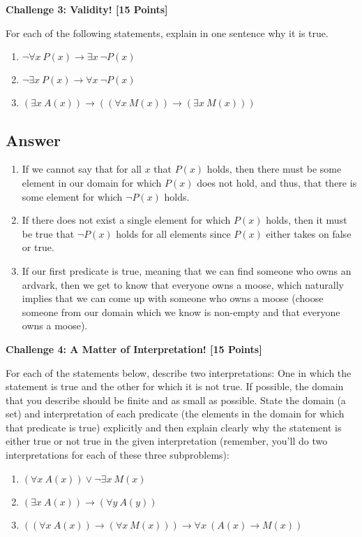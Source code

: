 \documentclass[12pt]{article}
\newcommand{\OR}{\vee}
\newcommand{\IMPLIES}{\rightarrow}
\newcommand{\Problem}[3]{\mbox{} \newline \noindent \textbf{\textbf{Challenge #1: #2 [#3 Points] \\ }}}
\begin{document}
\Problem{3}{Validity!}{15}

For each of the following statements, explain in one sentence why it is true.

\begin{enumerate}
	\item $\neg \forall x \ P(x) \IMPLIES \exists x \ \neg P(x)$
	\item $\neg \exists x \ P(x) \IMPLIES \forall x \ \neg P(x)$
	\item $(\exists x \ A(x)) \IMPLIES ((\forall x \ M(x)) \IMPLIES (\exists x \ M(x)))$
\end{enumerate}

\subsection*{Answer}
\begin{enumerate}
	\item If we cannot say that for all $x$ that $P(x)$ holds, then there must be some element in our domain for which $P(x)$ does not hold, and thus, that there is some element for which $\neg P(x)$ holds.
	\item If there does not exist a single element for which $P(x)$ holds, then it must be true that $\neg P(x)$ holds for all elements since $P(x)$ either takes on false or true.
	\item If our first predicate is true, meaning that we can find someone who owns an ardvark, then we get to know that everyone owns a moose, which naturally implies that we can come up with someone who owns a moose (choose someone from our domain which we know is non-empty and that everyone owns a moose).
\end{enumerate}

\Problem{4}{A Matter of Interpretation!}{15}

For each of the statements below, describe two interpretations:  One in which the statement is true and the other for which it is not true.  If possible, the domain that you describe should be finite and as small as possible. State the domain (a set) and interpretation of each predicate (the elements in the domain for which that predicate is true) explicitly and then explain clearly why the statement is either true or not true in the given interpretation (remember, you'll do two interpretations for each of these three subproblems):

\begin{enumerate}
	\item $(\forall x \ A(x)) \OR \neg \exists x \ M(x)$
	\item $(\exists x \ A(x)) \IMPLIES ( \forall y \ A(y) )$
	\item $((\forall x \ A(x)) \IMPLIES (\forall x \ M(x))) \IMPLIES \forall x \ (A(x) \IMPLIES M(x))$
\end{enumerate}
\end{document}
